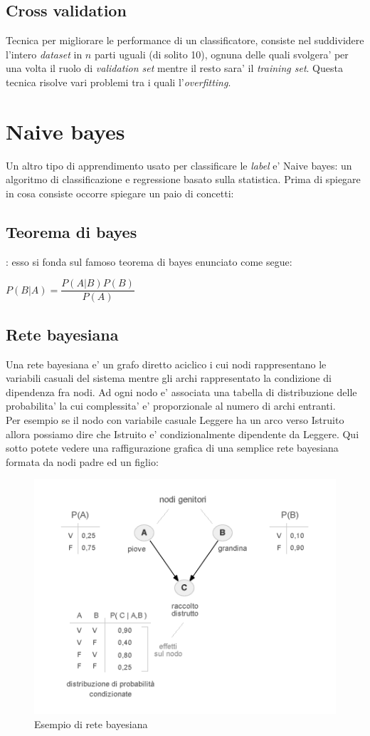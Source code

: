 \subsection*{Cross validation}
Tecnica per migliorare le performance di un classificatore, consiste nel suddividere l'intero \textit{dataset} in $n$ parti uguali (di solito 10), ognuna delle quali svolgera' per una volta il ruolo di \textit{validation set} mentre il resto sara' il \textit{training set}. Questa tecnica risolve vari problemi tra i quali l'\textit{overfitting}.\\

\section*{Naive bayes}
Un altro tipo di apprendimento usato per classificare le \textit{label} e' Naive bayes: un algoritmo di classificazione e regressione basato sulla statistica. Prima di spiegare in cosa consiste occorre spiegare un paio di concetti:
\subsection*{Teorema di bayes}
: esso si fonda sul famoso teorema di bayes enunciato come segue:
\begin{center}
	$P(B|A) = \dfrac{P(A|B)P(B)}{P(A)}$
\end{center}
\subsection*{Rete bayesiana}
Una rete bayesiana e' un grafo diretto aciclico i cui nodi rappresentano le variabili casuali del sistema mentre gli archi rappresentato la condizione di dipendenza fra nodi.
 Ad ogni nodo e' associata una tabella di distribuzione delle probabilita' la cui complessita' e' proporzionale al numero di archi entranti.\\ Per esempio se il nodo con variabile casuale Leggere ha un arco verso Istruito allora possiamo dire che Istruito e' condizionalmente dipendente da Leggere. Qui sotto potete vedere una raffigurazione grafica di una semplice rete bayesiana formata da nodi padre ed un figlio:
\begin{figure}[H]
	\centering
	\includegraphics[width=0.7\linewidth]{img/rete-bayesiana-grafo.png}
	\caption{Esempio di rete bayesiana}
	\label{fig:rete-bayesiana-grafo}
\end{figure}
\medskip
